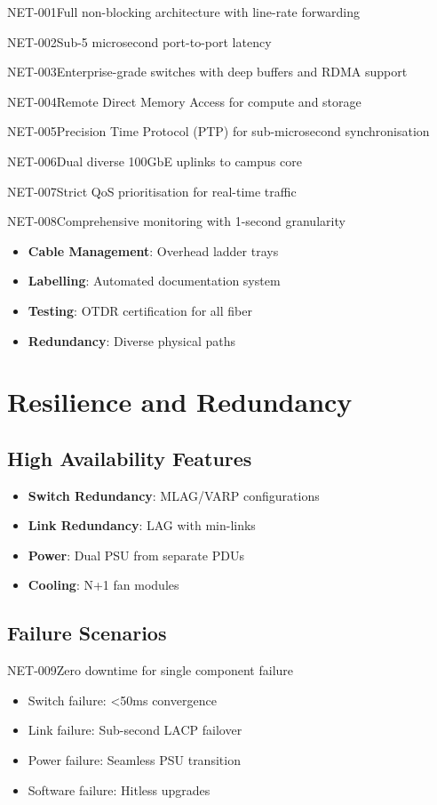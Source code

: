 \begin{requirement}{NET-001}{Full non-blocking architecture with line-rate forwarding}
\begin{requirement}{NET-002}{Sub-5 microsecond port-to-port latency}
\begin{requirement}{NET-003}{Enterprise-grade switches with deep buffers and RDMA support}
\begin{requirement}{NET-004}{Remote Direct Memory Access for compute and storage}
\begin{requirement}{NET-005}{Precision Time Protocol (PTP) for sub-microsecond synchronisation}
\begin{requirement}{NET-006}{Dual diverse 100GbE uplinks to campus core}
\begin{requirement}{NET-007}{Strict QoS prioritisation for real-time traffic}
\begin{requirement}{NET-008}{Comprehensive monitoring with 1-second granularity}
\begin{itemize}
    \item \textbf{Cable Management}: Overhead ladder trays
    \item \textbf{Labelling}: Automated documentation system
    \item \textbf{Testing}: OTDR certification for all fiber
    \item \textbf{Redundancy}: Diverse physical paths
\end{itemize}

\section{Resilience and Redundancy}

\subsection{High Availability Features}

\begin{itemize}
    \item \textbf{Switch Redundancy}: MLAG/VARP configurations
    \item \textbf{Link Redundancy}: LAG with min-links
    \item \textbf{Power}: Dual PSU from separate PDUs
    \item \textbf{Cooling}: N+1 fan modules
\end{itemize}

\subsection{Failure Scenarios}

\begin{requirement}{NET-009}{Zero downtime for single component failure}

\begin{itemize}
    \item Switch failure: <50ms convergence
    \item Link failure: Sub-second LACP failover
    \item Power failure: Seamless PSU transition
    \item Software failure: Hitless upgrades
\end{itemize}


\end{requirement}
\end{requirement}
\end{requirement}
\end{requirement}
\end{requirement}
\end{requirement}
\end{requirement}
\end{requirement}
\end{requirement}
